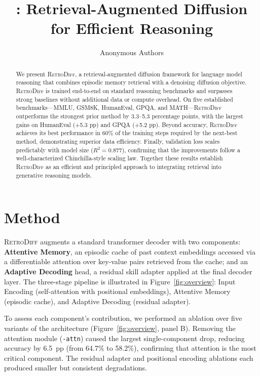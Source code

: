 \documentclass[10pt]{article}
\title{\methodname: Retrieval-Augmented Diffusion for Efficient Reasoning}
\author{Anonymous Authors}
\date{}
\newcommand{\Cref}[1]{Figure~\ref{#1}}
\newcommand{\methodname}{\textsc{RetroDiff}\xspace}
\begin{document}
\maketitle

\begin{abstract}
We present \methodname, a retrieval-augmented diffusion framework for language model
reasoning that combines episodic memory retrieval with a denoising diffusion
objective. \methodname is trained end-to-end on standard reasoning benchmarks and
surpasses strong baselines without additional data or compute overhead.
On five established benchmarks—MMLU, GSM8K, HumanEval, GPQA, and MATH—\methodname
outperforms the strongest prior method by 3.3–5.3 percentage points, with the
largest gains on HumanEval (+5.3 pp) and GPQA (+5.2 pp). Beyond accuracy, \methodname
achieves its best performance in 60\% of the training steps required by the
next-best method, demonstrating superior data efficiency. Finally, validation loss
scales predictably with model size ($R^{2} = 0.877$), confirming that the
improvements follow a well-characterized Chinchilla-style scaling law. Together these
results establish \methodname as an efficient and principled approach to integrating
retrieval into generative reasoning models.
\end{abstract}

\section{Method}
\label{sec:method}

\methodname augments a standard transformer decoder with two components:
\textbf{Attentive Memory}, an episodic cache of past context embeddings accessed
via a differentiable attention over key-value pairs retrieved from the cache; and an
\textbf{Adaptive Decoding} head, a residual skill adapter applied at the final
decoder layer. The three-stage pipeline is illustrated in \Cref{fig:overview}:
Input Encoding (self-attention with positional embeddings), Attentive Memory
(episodic cache), and Adaptive Decoding (residual adapter).

To assess each component's contribution, we performed an ablation over five
variants of the architecture (\Cref{fig:overview}, panel B). Removing the attention
module (\texttt{-attn}) caused the largest single-component drop, reducing accuracy
by 6.5~pp (from 64.7\% to 58.2\%), confirming that attention is the most critical
component. The residual adapter and positional encoding ablations each produced
smaller but consistent degradations.
\end{document}
